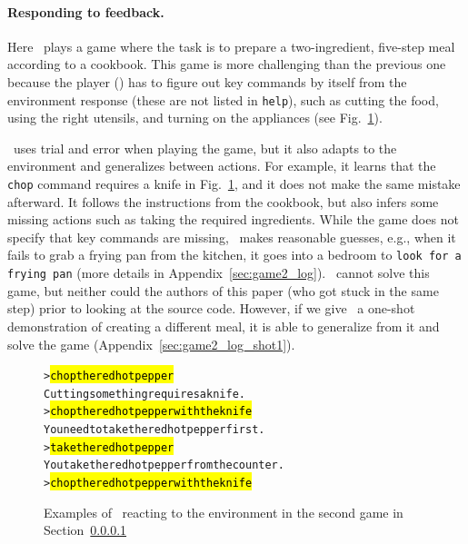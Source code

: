 \paragraph{Responding to feedback.}
\label{sec:game2}

Here \DV\ plays a game where the task is to prepare a two-ingredient, five-step meal according to a cookbook. This game is more challenging than the previous one because the player (\DV) has to figure out key commands by itself from the environment response (these are not listed in \texttt{help}), such as cutting the food, using the right utensils, and turning on the appliances (see Fig.~\ref{fig:game2}). 

\DV\ uses trial and error when playing the game, but it also adapts to the environment and generalizes between actions. For example, it learns that the \texttt{chop} command requires a knife in Fig.~\ref{fig:game2},  and it does not make the same mistake afterward. It follows the instructions from the cookbook, but also infers some missing actions such as taking the required ingredients.
While the game does not specify that key commands are missing, \DV\ makes reasonable guesses, e.g., when it fails to grab a frying pan from the kitchen, it goes into a bedroom to \texttt{look for a frying pan} (more details in Appendix~\ref{sec:game2_log}).
\DV\ cannot solve this game, but neither could the authors of this paper (who got stuck in the same step) prior to looking at the source code.
However, if we give \DV\ a one-shot demonstration of creating a different meal, it is able to generalize from it and solve the game (Appendix~\ref{sec:game2_log_shot1}). 




\begin{figure}[t] %
\centering %
\begin{AIbox}[width=0.6\textwidth]{\DV}
\scriptsize \begin{alltt}
> \hl{chop the red hot pepper}
Cutting something requires a knife.
> \hl{chop the red hot pepper with the knife}
You need to take the red hot pepper first.
> \hl{take the red hot pepper}
You take the red hot pepper from the counter.
> \hl{chop the red hot pepper with the knife}
\end{alltt}
\end{AIbox}
\caption{Examples of \DV\ reacting to the environment in the second game in Section~\ref{sec:game2}}
\label{fig:game2}
\end{figure}

